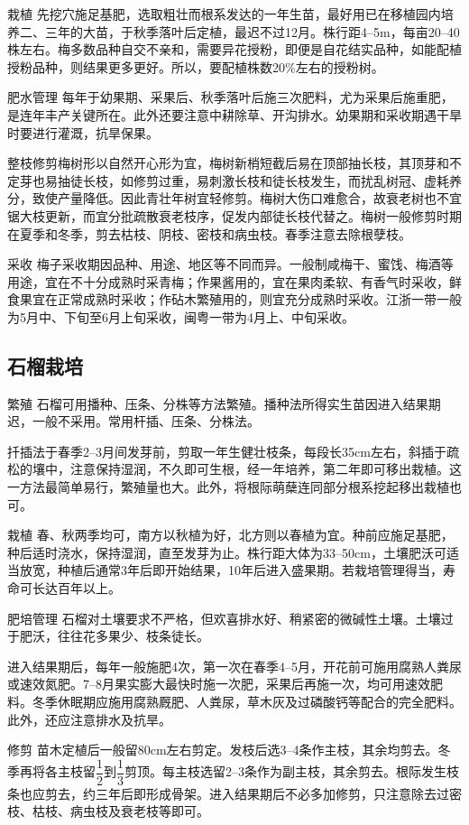 \documentclass{ctexbook}
\begin{document}
栽植 先挖穴施足基肥，选取粗壮而根系发达的一年生苗，最好用已在移植园内培养二、三年的大苗，于秋季落叶后定植，最迟不过12月。株行距4--5m，每亩20--40株左右。梅多数品种自交不亲和，需要异花授粉，即便是自花结实品种，如能配植授粉品种，则结果更多更好。所以，要配植株数20\%左右的授粉树。

肥水管理 每年于幼果期、采果后、秋季落叶后施三次肥料，尤为采果后施重肥，是连年丰产关键所在。此外还要注意中耕除草、开沟排水。幼果期和采收期遇干旱时要进行灌溉，抗旱保果。

整枝修剪梅树形以自然开心形为宜，梅树新梢短截后易在顶部抽长枝，其顶芽和不定芽也易抽徒长枝，如修剪过重，易刺激长枝和徒长枝发生，而扰乱树冠、虚耗养分，致使产量降低。因此青壮年树宜轻修剪。梅树大伤口难愈合，故衰老树也不宜锯大枝更新，而宜分批疏散衰老枝序，促发内部徒长枝代替之。梅树一般修剪时期在夏季和冬季，剪去枯枝、阴枝、密枝和病虫枝。春季注意去除根孽枝。

采收 梅子采收期因品种、用途、地区等不同而异。一般制咸梅干、蜜饯、梅酒等用途，宜在不十分成熟时采青梅；作果酱用的，宜在果肉柔软、有香气时采收，鲜食果宜在正常成熟时采收；作砧木繁殖用的，则宜充分成熟时采收。江浙一带一般为5月中、下旬至6月上旬采收，闽粤一带为4月上、中旬采收。
\subsection{石榴栽培}
繁殖 石榴可用播种、压条、分株等方法繁殖。播种法所得实生苗因进入结果期迟，一般不采用。常用杆插、压条、分株法。

扦插法于春季2--3月间发芽前，剪取一年生健壮枝条，每段长35cm左右，斜插于疏松的壤中，注意保持湿润，不久即可生根，经一年培养，第二年即可移出栽植。这一方法最简单易行，繁殖量也大。此外，将根际萌蘖连同部分根系挖起移出栽植也可。

栽植 春、秋两季均可，南方以秋植为好，北方则以春植为宜。种前应施足基肥，种后适时浇水，保持湿润，直至发芽为止。株行距大体为33--50cm，土壤肥沃可适当放宽，种植后通常3年后即开始结果，10年后进入盛果期。若栽培管理得当，寿命可长达百年以上。

肥培管理 石榴对土壤要求不严格，但欢喜排水好、稍紧密的微碱性土壤。土壤过于肥沃，往往花多果少、枝条徒长。

进入结果期后，每年一般施肥4次，第一次在春季4--5月，开花前可施用腐熟人粪尿或速效氮肥。7--8月果实膨大最快时施一次肥，采果后再施一次，均可用速效肥料。冬季休眠期应施用腐熟厩肥、人粪尿，草木灰及过磷酸钙等配合的完全肥料。此外，还应注意排水及抗旱。

修剪 苗木定植后一般留80cm左右剪定。发枝后选3--4条作主枝，其余均剪去。冬季再将各主枝留$\dfrac{1}{2}$到$\dfrac{1}{3}$剪顶。每主枝选留2--3条作为副主枝，其余剪去。根际发生枝条也应剪去，约三年后即形成骨架。进入结果期后不必多加修剪，只注意除去过密枝、枯枝、病虫枝及衰老枝等即可。
\end{document}
